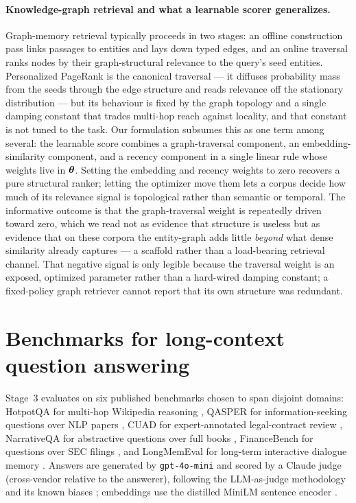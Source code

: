 \paragraph{Knowledge-graph retrieval and what a learnable scorer generalizes.}
Graph-memory retrieval typically proceeds in two stages: an offline construction
pass links passages to entities and lays down typed edges, and an online
traversal ranks nodes by their graph-structural relevance to the query's seed
entities. Personalized PageRank is the canonical traversal --- it diffuses
probability mass from the seeds through the edge structure and reads relevance
off the stationary distribution \citep{gutierrez2024hipporag} --- but its
behaviour is fixed by the graph topology and a single damping constant that
trades multi-hop reach against locality, and that constant is not tuned to the
task. Our formulation subsumes this as one term among several: the learnable
score combines a graph-traversal component, an embedding-similarity component,
and a recency component in a single linear rule whose weights live in
$\boldsymbol{\theta}$. Setting the embedding and recency weights to zero recovers a
pure structural ranker; letting the optimizer move them lets a corpus decide how
much of its relevance signal is topological rather than semantic or temporal.
The informative outcome is that the graph-traversal weight is repeatedly driven
toward zero, which we read not as evidence that structure is useless but as
evidence that on these corpora the entity-graph adds little \emph{beyond} what
dense similarity already captures --- a scaffold rather than a load-bearing
retrieval channel. That negative signal is only legible because the traversal
weight is an exposed, optimized parameter rather than a hard-wired damping
constant; a fixed-policy graph retriever cannot report that its own structure
was redundant.

\section{Benchmarks for long-context question answering}
Stage~3 evaluates on six published benchmarks chosen to span disjoint domains:
HotpotQA for multi-hop Wikipedia reasoning \citep{yang2018hotpotqa}, QASPER for
information-seeking questions over NLP papers \citep{dasigi2021qasper}, CUAD for
expert-annotated legal-contract review \citep{hendrycks2021cuad}, NarrativeQA for
abstractive questions over full books \citep{kocisky2018narrativeqa}, FinanceBench
for questions over SEC filings \citep{islam2023financebench}, and LongMemEval for
long-term interactive dialogue memory \citep{wu2024longmemeval}. Answers are
generated by \texttt{gpt-4o-mini} and scored by a Claude judge (cross-vendor
relative to the answerer), following the LLM-as-judge methodology and its known
biases \citep{zheng2023judge}; embeddings use the distilled MiniLM sentence
encoder \citep{wang2020minilm,reimers2019sbert}.

